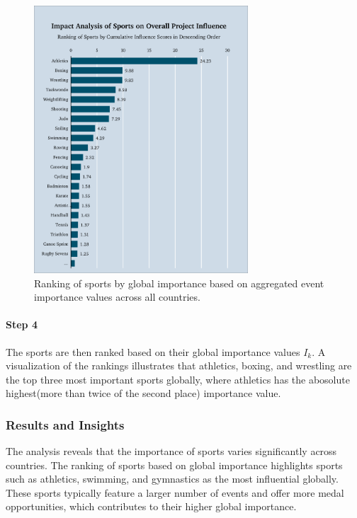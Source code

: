 \documentclass{mcmthesis}
\begin{document}
\begin{figure}  %
    \centering
    \includegraphics[width=0.9\linewidth,height=10cm]{pics/sport_influence_whole.png}
    \caption{Ranking of sports by global importance based on aggregated event importance values across all countries.}
    \label{fig:sport_importance}
\end{figure}



\paragraph{Step 4}
The sports are then ranked based on their global importance values $I_k$. A visualization of the rankings illustrates that athletics, boxing, and wrestling are the top three most important sports globally, where athletics has the abosolute highest(more than twice of the second place) importance value.

\subsubsection{Results and Insights}
The analysis reveals that the importance of sports varies significantly across countries. The ranking of sports based on global importance highlights sports such as athletics, swimming, and gymnastics as the most influential globally. These sports typically feature a larger number of events and offer more medal opportunities, which contributes to their higher global importance.

\end{document}

